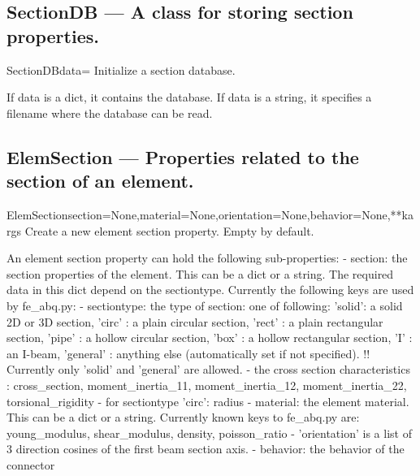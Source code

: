 \subsection{SectionDB --- A class for storing section properties.}


\begin{classdesc}{SectionDB}{data={}}
Initialize a section database.

        If data is a dict, it contains the database.
        If data is a string, it specifies a filename where the
        database can be read.
        
\end{classdesc}

\subsection{ElemSection --- Properties related to the section of an element.}


\begin{classdesc}{ElemSection}{section=None,material=None,orientation=None,behavior=None,**kargs}
Create a new element section property. Empty by default.
        
        An element section property can hold the following sub-properties:
       - section: the section properties of the element. This can be a dict
          or a string. The required data in this dict depend on the
          sectiontype. Currently the following keys are used by fe_abq.py:
            - sectiontype: the type of section: one of following:
              'solid': a solid 2D or 3D section,
              'circ' : a plain circular section,
              'rect' : a plain rectangular section,
              'pipe' : a hollow circular section,
              'box'  : a hollow rectangular section,
              'I'    : an I-beam,
              'general' : anything else (automatically set if not specified).
              !! Currently only 'solid' and 'general' are allowed.
            - the cross section characteristics :
              cross_section, moment_inertia_11, moment_inertia_12,
              moment_inertia_22, torsional_rigidity
            - for sectiontype 'circ': radius
         - material: the element material. This can be a dict or a string.
          Currently known keys to fe_abq.py are:
            young_modulus, shear_modulus, density, poisson_ratio
        - 'orientation' is a list of 3 direction cosines of the first beam
          section axis.
        - behavior: the behavior of the connector
        
\end{classdesc}

